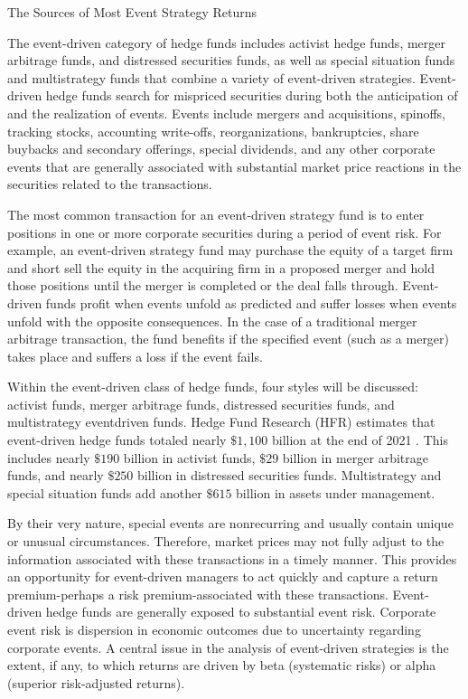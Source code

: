 \documentclass[11pt]{article}
\begin{document}
The Sources of Most Event Strategy Returns

The event-driven category of hedge funds includes activist hedge funds, merger arbitrage funds, and distressed securities funds, as well as special situation funds and multistrategy funds that combine a variety of event-driven strategies. Event-driven hedge funds search for mispriced securities during both the anticipation of and the realization of events. Events include mergers and acquisitions, spinoffs, tracking stocks, accounting write-offs, reorganizations, bankruptcies, share buybacks and secondary offerings, special dividends, and any other corporate events that are generally associated with substantial market price reactions in the securities related to the transactions.

The most common transaction for an event-driven strategy fund is to enter positions in one or more corporate securities during a period of event risk. For example, an event-driven strategy fund may purchase the equity of a target firm and short sell the equity in the acquiring firm in a proposed merger and hold those positions until the merger is completed or the deal falls through. Event-driven funds profit when events unfold as predicted and suffer losses when events unfold with the opposite consequences. In the case of a traditional merger arbitrage transaction, the fund benefits if the specified event (such as a merger) takes place and suffers a loss if the event fails.

Within the event-driven class of hedge funds, four styles will be discussed: activist funds, merger arbitrage funds, distressed securities funds, and multistrategy eventdriven funds. Hedge Fund Research (HFR) estimates that event-driven hedge funds totaled nearly $\$ 1,100$ billion at the end of 2021 . This includes nearly $\$ 190$ billion in activist funds, $\$ 29$ billion in merger arbitrage funds, and nearly $\$ 250$ billion in distressed securities funds. Multistrategy and special situation funds add another $\$ 615$ billion in assets under management.

By their very nature, special events are nonrecurring and usually contain unique or unusual circumstances. Therefore, market prices may not fully adjust to the information associated with these transactions in a timely manner. This provides an opportunity for event-driven managers to act quickly and capture a return premium-perhaps a risk premium-associated with these transactions. Event-driven hedge funds are generally exposed to substantial event risk. Corporate event risk is dispersion in economic outcomes due to uncertainty regarding corporate events. A central issue in the analysis of event-driven strategies is the extent, if any, to which returns are driven by beta (systematic risks) or alpha (superior risk-adjusted returns).
\end{document}
